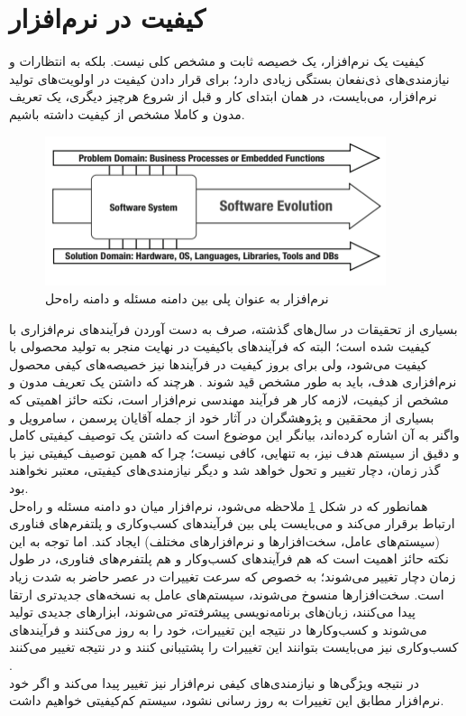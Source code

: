 \section{کیفیت در نرم‌افزار}
کیفیت یک نرم‌افزار، یک خصیصه ثابت و مشخص کلی نیست. بلکه به انتظارات و نیازمندی‌های ذی‌نفعان بستگی زیادی دارد؛ برای قرار دادن کیفیت در اولویت‌های تولید نرم‌افزار، می‌بایست، در همان ابتدای کار و قبل از شروع هرچیز دیگری، یک تعریف مدون و کاملا مشخص از کیفیت داشته باشیم.\\
\begin{figure}[H]
	\centering\includegraphics[width=10cm]{Resources/mediator.PNG}
	\caption{نرم‌افزار به عنوان پلی بین دامنه مسئله و دامنه راه‌حل
		\cite{wagner_software_2013}
	}
	\label{fig:mediator}
\end{figure}
بسیاری از تحقیقات در سال‌های گذشته، صرف به دست آوردن فرآیندهای نرم‌افزاری با کیفیت شده است؛ البته که فرآیندهای باکیفیت در نهایت منجر به تولید محصولی با کیفیت می‌شود، ولی برای بروز کیفیت در فرآیندها نیز خصیصه‌های کیفی محصول نرم‌افزاری هدف، باید به طور مشخص قید شوند
\cite{sommerville_software_2016}.
هرچند که داشتن یک تعریف مدون و مشخص از کیفیت، لازمه کار هر فرآیند مهندسی نرم‌افزار است، نکته حائز اهمیتی که بسیاری از محققین و پژوهشگران در آثار خود از جمله آقایان پرسمن
\cite{pressman_software_2015}،
سامرویل
\cite{sommerville_software_2016}
و واگنر
\cite{wagner_software_2013}
به آن اشاره کرده‌اند، بیانگر این موضوع است که داشتن یک توصیف کیفیتی  کامل و دقیق از سیستم هدف نیز، به تنهایی، کافی نیست؛ چرا که همین توصیف کیفیتی نیز با گذر زمان، دچار تغییر و تحول خواهد شد و دیگر نیازمندی‌های کیفیتی، معتبر نخواهند بود.\\
همانطور که در شکل
\ref{fig:mediator}
ملاحظه می‌شود، نرم‌افزار میان دو دامنه مسئله و راه‌حل ارتباط برقرار می‌کند و می‌بایست پلی بین فرآیند‌های کسب‌وکاری و پلتفرم‌های فناوری (سیستم‌های عامل، سخت‌افزارها و نرم‌افزارهای مختلف) ایجاد کند. اما توجه به این نکته حائز اهمیت است که هم فرآیندهای کسب‌وکار و هم پلتفرم‌های فناوری، در طول زمان دچار تغییر می‌شوند؛ به خصوص که سرعت تغییرات در عصر حاضر به شدت زیاد است. سخت‌افزارها منسوخ می‌شوند، سیستم‌های عامل به نسخه‌های جدیدتری ارتقا پیدا می‌کنند، زبان‌های برنامه‌نویسی پیشرفته‌تر می‌شوند، ابزارهای جدیدی تولید می‌شوند و کسب‌وکارها در نتیجه این تغییرات، خود را به روز می‌کنند و فرآیندهای کسب‌وکاری نیز می‌بایست بتوانند این تغییرات را پشتیبانی کنند و در نتیجه تغییر می‌کنند
\cite{wagner_software_2013}.\\
در نتیجه ویژگی‌ها و نیازمندی‌های کیفی نرم‌افزار نیز تغییر پیدا می‌کند و اگر خود نرم‌افزار مطابق این تغییرات به روز رسانی نشود، سیستم کم‌کیفیتی خواهیم داشت.
